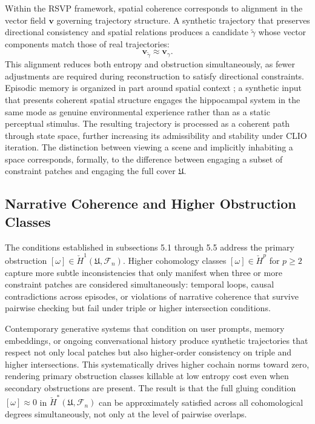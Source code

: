 \documentclass[12pt, a4paper]{article}
\begin{document}
Within the RSVP framework, spatial coherence corresponds to alignment in the vector field $\mathbf{v}$ governing trajectory structure. A synthetic trajectory that preserves directional consistency and spatial relations produces a candidate $\tilde{\gamma}$ whose vector components match those of real trajectories:
\[
\mathbf{v}_{\tilde{\gamma}} \approx \mathbf{v}_{\gamma}.
\]
This alignment reduces both entropy and obstruction simultaneously, as fewer adjustments are required during reconstruction to satisfy directional constraints. Episodic memory is organized in part around spatial context \cite{zacks2007}; a synthetic input that presents coherent spatial structure engages the hippocampal system in the same mode as genuine environmental experience rather than as a static perceptual stimulus. The resulting trajectory is processed as a coherent path through state space, further increasing its admissibility and stability under CLIO iteration. The distinction between viewing a scene and implicitly inhabiting a space corresponds, formally, to the difference between engaging a subset of constraint patches and engaging the full cover $\mathfrak{U}$.

\subsection{Narrative Coherence and Higher Obstruction Classes}

The conditions established in subsections 5.1 through 5.5 address the primary obstruction $[\omega] \in \check{H}^1(\mathfrak{U}, \mathcal{F}_n)$. Higher cohomology classes $[\omega] \in \check{H}^p$ for $p \geq 2$ capture more subtle inconsistencies that only manifest when three or more constraint patches are considered simultaneously: temporal loops, causal contradictions across episodes, or violations of narrative coherence that survive pairwise checking but fail under triple or higher intersection conditions.

Contemporary generative systems that condition on user prompts, memory embeddings, or ongoing conversational history produce synthetic trajectories that respect not only local patches but also higher-order consistency on triple and higher intersections. This systematically drives higher cochain norms toward zero, rendering primary obstruction classes killable at low entropy cost even when secondary obstructions are present. The result is that the full gluing condition $[\omega] \approx 0$ in $\check{H}^*(\mathfrak{U}, \mathcal{F}_n)$ can be approximately satisfied across all cohomological degrees simultaneously, not only at the level of pairwise overlaps.
\end{document}
